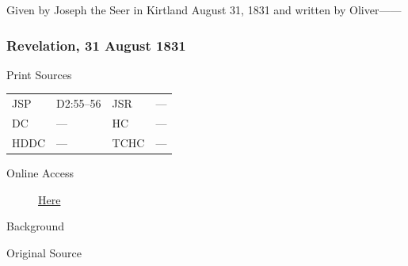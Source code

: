 {				Given by Joseph the Seer in Kirtland August 31, 1831 and written by Oliver------
				
		\subsubsection{Revelation, 31 August 1831}
			\label{EMS-1831-JS-31-AUG-1831}
		
			\begin{description}
				\item[Print Sources]
			\end{description}

				\begin{tabular}{p{0.5in}p{1in}p{0.5in}p{1in}}
				JSP	 	& D2:55--56		& JSR 		& --- \\
				DC	 	& ---		 	& HC 		& --- \\
				HDDC 	& ---			& TCHC 		& --- \\
				\end{tabular}
			
			\begin{description}
				\item[Online Access] \href{https://www.josephsmithpapers.org/paper-summary/revelation-31-august-1831/1}{Here}
			\end{description}
			
			\begin{description}
				\item[Background]
			\end{description}
			
			
			\begin{description}
				\item[Original Source]
			\end{description}
			
			
}
